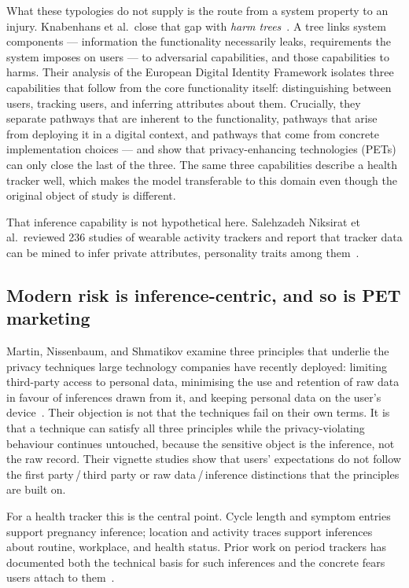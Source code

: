 What these typologies do not supply is the route from a system property to an
injury. Knabenhans et al.\ close that gap with \emph{harm
trees}~\parencite{knabenhans2026harms}. A tree links system components ---
information the functionality necessarily leaks, requirements the system
imposes on users --- to adversarial capabilities, and those capabilities to
harms. Their analysis of the European Digital Identity Framework isolates three
capabilities that follow from the core functionality itself: distinguishing
between users, tracking users, and inferring attributes about them. Crucially,
they separate pathways that are inherent to the functionality, pathways that
arise from deploying it in a digital context, and pathways that come from
concrete implementation choices --- and show that privacy-enhancing
technologies (PETs) can only close the last of the three. The same three
capabilities describe a health tracker well, which makes the model transferable
to this domain even though the original object of study is different.

That inference capability is not hypothetical here. Salehzadeh Niksirat et al.\
reviewed 236 studies of wearable activity trackers and report that tracker data
can be mined to infer private attributes, personality traits among
them~\parencite{niksirat2024wearable}.

\subsection{Modern risk is inference-centric, and so is PET marketing}

Martin, Nissenbaum, and Shmatikov examine three principles that underlie the
privacy techniques large technology companies have recently deployed:
limiting third-party access to personal data, minimising the use and retention
of raw data in favour of inferences drawn from it, and keeping personal data on
the user's device~\parencite{martin2025cookies}. Their objection is not that the
techniques fail on their own terms. It is that a technique can satisfy all
three principles while the privacy-violating behaviour continues untouched,
because the sensitive object is the inference, not the raw record. Their
vignette studies show that users' expectations do not follow the first
party\,/\,third party or raw data\,/\,inference distinctions that the principles
are built on.

For a health tracker this is the central point. Cycle length and symptom entries
support pregnancy inference; location and activity traces support inferences
about routine, workplace, and health status. Prior work on period trackers has
documented both the technical basis for such inferences and the concrete fears
users attach to them~\parencite{cao2024deleted,shipp2020period}.

